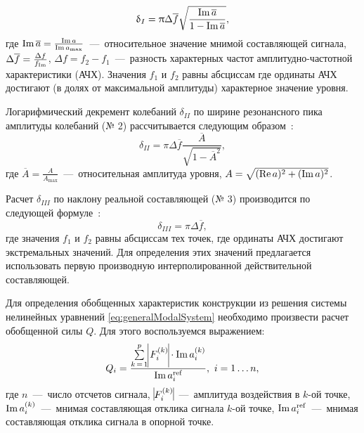 \begin{equation}
	\updelta_I = \uppi \Delta \overline{f} \sqrt{\frac{\operatorname{Im} \overline{a}}{1 - \operatorname{Im} \overline{a}}}, \label{eq:decrementWidthImaginaryPeak}
\end{equation}
где $ \operatorname{Im} \overline{a} = \frac{\operatorname{Im} a}{\operatorname{Im} a_{\max}} $~---~относительное значение мнимой составляющей сигнала, $ \Delta \overline{f} = \frac{\Delta f}{f_{\operatorname{Im}}}$, $ \Delta f = f_2 - f_1 $~---~разность характерных частот амплитудно-частотной характеристики (АЧХ). Значения $ f_1 $ и $ f_2 $ равны абсциссам где ординаты АЧХ достигают (в долях от максимальной амплитуды) характерное значение уровня.

Логарифмический декремент колебаний $ \delta_{II} $ по ширине резонансного пика амплитуды колебаний (№ 2) рассчитывается следующим образом~\cite{lib:aprobation:Moskalik}:
\begin{equation}
	\delta_{II} = \pi \Delta \overline{f} \frac{\overline{A}}{\sqrt{1 - \overline{A} ^ 2}}, \label{eq:decrementWidthAmplitudePeak}
\end{equation}
где $ \overline{A} = \frac{A}{A_{\max}}$~---~относительная амплитуда уровня, $ A = \sqrt{(\operatorname{Re} a) ^ 2 + (\operatorname{Im} a) ^ 2} $.

Расчет  $ \delta_{III} $ по наклону реальной составляющей (№ 3) производится по следующей формуле~\cite{lib:aprobation:Moskalik}:
\begin{equation}
	\delta_{III} = \pi \Delta \overline{f},
	\label{eq:decrementAngleReal}
\end{equation}
где значения $ f_1 $ и $ f_2 $ равны абсциссам тех точек, где ординаты АЧХ достигают экстремальных значений. Для определения этих значений предлагается использовать первую производную интерполированной действительной составляющей.

Для определения обобщенных характеристик конструкции из решения системы нелинейных уравнений \eqref{eq:generalModalSystem} необходимо произвести расчет обобщенной силы $ Q $. Для этого воспользуемся выражением:
\begin{equation}
	Q_i = \frac{\sum\limits_{k\,=\,1} ^ p \vline F_i ^ {(k)} \vline \cdot \imag a_i ^ {(k)}}{\imag a_i ^ {\text{ref}}}, \ i = 1 \hdots n,
\end{equation}
где $ n $~---~число отсчетов сигнала, $ \vline F_i ^ {(k)} \vline $~---~амплитуда воздействия в $ k $-ой точке, $ \operatorname{Im} a_i ^ {(k)} $~---~мнимая составляющая отклика сигнала $ k $-ой точке, $ \operatorname{Im} a_i ^ {\text{ref}} $~---~мнимая составляющая отклика сигнала в опорной точке.

